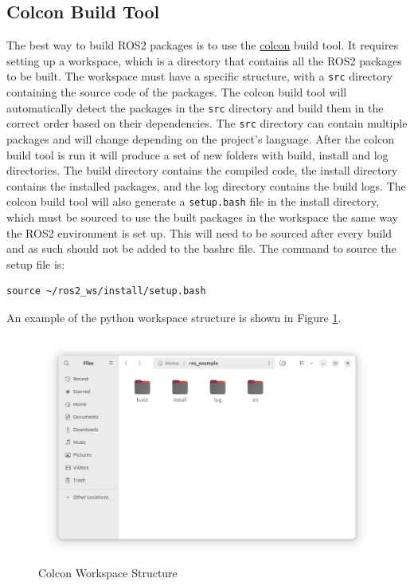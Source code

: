 \documentclass[10pt,a4paper,english]{article}
\begin{document}
\subsection{Colcon Build Tool}
The best way to build ROS2 packages is to use the \href{https://docs.ros.org/en/kilted/Tutorials/Beginner-Client-Libraries/Colcon-Tutorial.html}{colcon} build tool. It requires setting up a workspace, which is a directory that contains all the ROS2 packages to be built. The workspace must have a specific structure, with a \texttt{src} directory containing the source code of the packages. The colcon build tool will automatically detect the packages in the \texttt{src} directory and build them in the correct order based on their dependencies. The \texttt{src} directory can contain multiple packages and will change depending on the project's language. After the colcon build tool is run it will produce a set of new folders with build, install and log directories. The build directory contains the compiled code, the install directory contains the installed packages, and the log directory contains the build logs. The colcon build tool will also generate a \texttt{setup.bash} file in the install directory, which must be sourced to use the built packages in the workspace the same way the ROS2 environment is set up. This will need to be sourced after every build and as such should not be added to the bashrc file. The command to source the setup file is:
\begin{lstlisting}
source ~/ros2_ws/install/setup.bash
\end{lstlisting}
An example of the python workspace structure is shown in Figure \ref{fig:colcon_workspace_structure}.
\begin{figure}[ht]
    \centering
    \includegraphics[width=1.0\textwidth]{colcon_build_folder.png}
    \caption{Colcon Workspace Structure}
    \label{fig:colcon_workspace_structure}
\end{figure} \par
\end{document}
